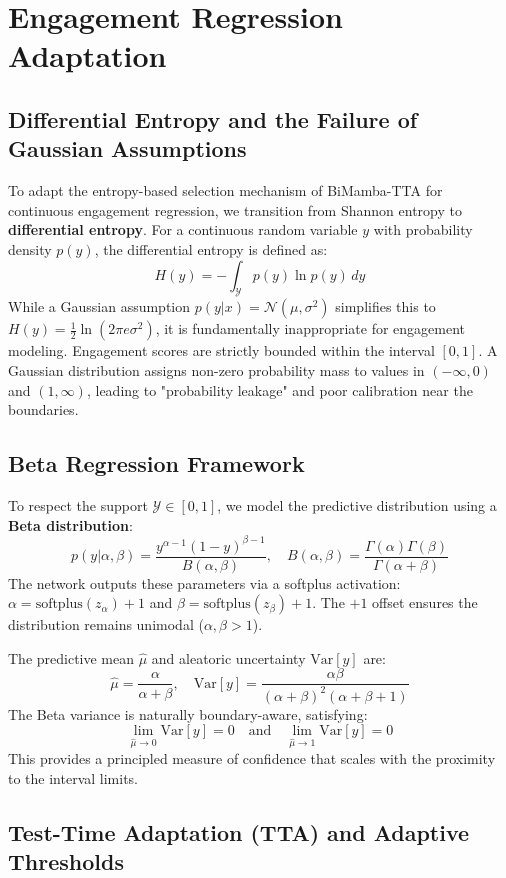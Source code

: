 \documentclass[11pt,a4paper]{article}
\begin{document}
	\section{Engagement Regression Adaptation}
	
	\subsection{Differential Entropy and the Failure of Gaussian Assumptions}
	To adapt the entropy-based selection mechanism of BiMamba-TTA for continuous engagement regression, we transition from Shannon entropy to \textbf{differential entropy}. For a continuous random variable $y$ with probability density $p(y)$, the differential entropy is defined as:
	$$ H(y) = -\int_{\mathcal{Y}} p(y) \ln p(y) \, dy $$
	While a Gaussian assumption $p(y|x) = \mathcal{N}(\mu, \sigma^2)$ simplifies this to $H(y) = \frac{1}{2}\ln(2\pi e \sigma^2)$, it is fundamentally inappropriate for engagement modeling. Engagement scores are strictly bounded within the interval $[0, 1]$. A Gaussian distribution assigns non-zero probability mass to values in $(-\infty, 0)$ and $(1, \infty)$, leading to "probability leakage" and poor calibration near the boundaries.
	
	\subsection{Beta Regression Framework}
	To respect the support $\mathcal{Y} \in [0, 1]$, we model the predictive distribution using a \textbf{Beta distribution}:
	$$ p(y|\alpha, \beta) = \frac{y^{\alpha-1}(1-y)^{\beta-1}}{B(\alpha, \beta)}, \quad B(\alpha, \beta) = \frac{\Gamma(\alpha)\Gamma(\beta)}{\Gamma(\alpha+\beta)} $$
	The network outputs these parameters via a softplus activation: $\alpha = \text{softplus}(z_\alpha) + 1$ and $\beta = \text{softplus}(z_\beta) + 1$. The $+1$ offset ensures the distribution remains unimodal ($\alpha, \beta > 1$). 
	
	The predictive mean $\hat{\mu}$ and aleatoric uncertainty $\text{Var}[y]$ are:
	$$ \hat{\mu} = \frac{\alpha}{\alpha + \beta}, \quad \text{Var}[y] = \frac{\alpha\beta}{(\alpha+\beta)^2(\alpha+\beta+1)} $$
	The Beta variance is naturally boundary-aware, satisfying: 
	$$ \lim_{\hat{\mu} \to 0} \text{Var}[y] = 0 \quad \text{and} \quad \lim_{\hat{\mu} \to 1} \text{Var}[y] = 0 $$
	This provides a principled measure of confidence that scales with the proximity to the interval limits.
	
	\subsection{Test-Time Adaptation (TTA) and Adaptive Thresholds}
	
\end{document}
